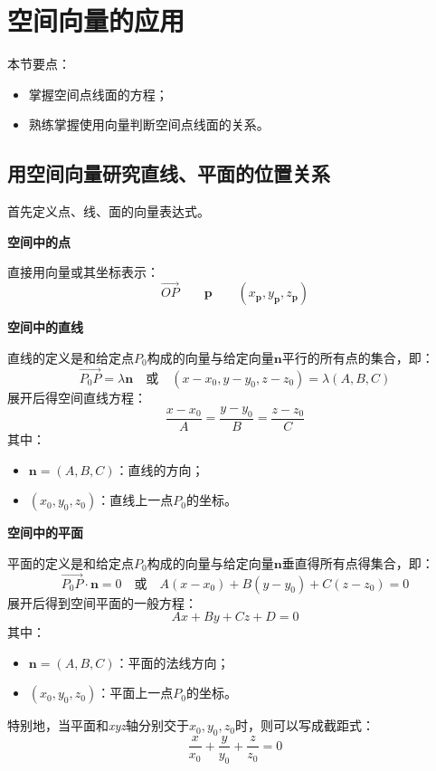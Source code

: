\section{空间向量的应用}

本节要点：
\begin{itemize}
    \item 掌握空间点线面的方程；
    \item 熟练掌握使用向量判断空间点线面的关系。
\end{itemize}

\subsection{用空间向量研究直线、平面的位置关系}

首先定义点、线、面的向量表达式。

{\bf 空间中的点}

直接用向量或其坐标表示：
\[
\overrightarrow{OP} \qquad \boldsymbol{p} \qquad \left( x_{\boldsymbol{p}},y_{\boldsymbol{p}},z_{\boldsymbol{p}} \right)
\]

{\bf 空间中的直线}

直线的定义是和给定点$P_0$构成的向量与给定向量$\boldsymbol{n}$平行的所有点的集合，即：
\[
\overrightarrow{P_0P}=\lambda \boldsymbol{n} \quad \text{或} \quad \left( x-x_0,y-y_0,z-z_0 \right) =\lambda \left( A,B,C \right)
\]
展开后得空间直线方程：
\[
\frac{x-x_0}{A}=\frac{y-y_0}{B}=\frac{z-z_0}{C}
\]
其中：
\begin{itemize}
    \item $\boldsymbol{n}=\left( A,B,C \right) $：直线的方向；
    \item $\left( x_0,y_0,z_0 \right) $：直线上一点$P_0$的坐标。
\end{itemize}

{\bf 空间中的平面}

平面的定义是和给定点$P_0$构成的向量与给定向量$\boldsymbol{n}$垂直得所有点得集合，即：
\[
\overrightarrow{P_0P}\cdot \boldsymbol{n}=0 \quad \text{或} \quad A\left( x-x_0 \right) +B\left( y-y_0 \right) +C\left( z-z_0 \right) =0
\]
展开后得到空间平面的一般方程：
\[
Ax+By+Cz+D=0
\]
其中：
\begin{itemize}
    \item $\boldsymbol{n}=\left( A,B,C \right) $：平面的法线方向；
    \item $\left( x_0,y_0,z_0 \right) $：平面上一点$P_0$的坐标。
\end{itemize}
特别地，当平面和{\it xyz}轴分别交于$x_0,y_0,z_0$时，则可以写成截距式：
\[
\frac{x}{x_0}+\frac{y}{y_0}+\frac{z}{z_0}=0
\]

